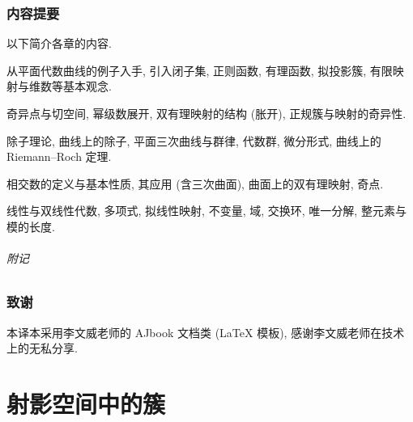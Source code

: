 \section*{内容提要}
以下简介各章的内容.
\begin{asparadesc}
	\item [第一章\ 基本概念] 从平面代数曲线的例子入手, 引入闭子集, 正则函数, 有理函数, 拟投影簇, 有限映射与维数等基本观念.

	\item [第二章\ 局部性质] 奇异点与切空间, 幂级数展开, 双有理映射的结构 (胀开), 正规簇与映射的奇异性.

	\item [第三章\ 除子与微分形式] 除子理论, 曲线上的除子, 平面三次曲线与群律, 代数群, 微分形式, 曲线上的 Riemann--Roch 定理.

	\item [第四章\ 相交数] 相交数的定义与基本性质, 其应用 (含三次曲面), 曲面上的双有理映射, 奇点.

	\item [代数附录] 线性与双线性代数, 多项式, 拟线性映射, 不变量, 域, 交换环, 唯一分解, 整元素与模的长度.
\end{asparadesc}

\paragraph*{附记}


\section*{致谢}
本译本采用李文威老师的 AJbook 文档类 (\LaTeX{} 模板), 感谢李文威老师在技术上的无私分享.



\let\cleardoublepage\clearpage
\part{射影空间中的簇}

\let\cleardoublepage\clearpage
